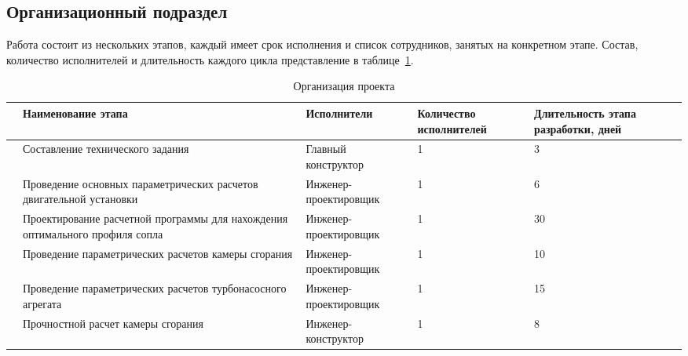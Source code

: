 \subsection{Организационный подраздел}

Работа состоит из нескольких этапов, каждый имеет срок исполнения и список сотрудников, занятых на конкретном этапе. Состав, количество исполнителей и длительность каждого цикла представление в таблице~\ref{tab:org-proj}.

\begin{longtable}{|p{.5cm}|p{4cm}|p{4cm}|p{2.8cm}|p{3cm}|}
	\caption{Организация проекта}\label{tab:org-proj}                                                                                                                                  \\
	\hline
	\textnumero & Наименование этапа                                                           & Исполнители           & Количество исполнителей & Длительность этапа разработки, дней \\
	\hline
	\endhead
	\newcounter{opnum}
	\setcounter{opnum}{1}
	\theopnum   & Составление технического задания                                             & Главный конструктор   & 1                       & 3                                   \\
	\hline \addtocounter{opnum}{1}
	\theopnum   & Проведение основных параметрических расчетов двигательной установки          & Инженер-проектировщик & 1                       & 6                                   \\
	\hline \addtocounter{opnum}{1}
	\theopnum   & Проектирование расчетной программы для нахождения оптимального профиля сопла & Инженер-проектировщик & 1                       & 30                                  \\
	\hline \addtocounter{opnum}{1}
	\theopnum   & Проведение параметрических расчетов камеры сгорания                          & Инженер-проектировщик & 1                       & 10                                  \\
	\hline \addtocounter{opnum}{1}
	\theopnum   & Проведение параметрических расчетов турбонасосного агрегата                  & Инженер-проектировщик & 1                       & 15                                  \\
	\hline \addtocounter{opnum}{1}
	\theopnum   & Прочностной расчет камеры сгорания                                           & Инженер-конструктор   & 1                       & 8                                   \\

\end{longtable}
